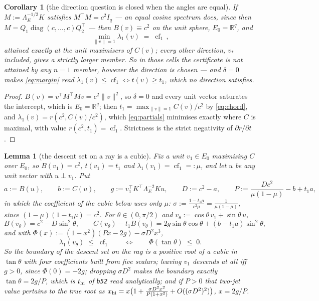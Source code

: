 \documentclass[11pt]{article}
\newtheorem{corollary}[theorem]{Corollary}
\newtheorem{lemma}[theorem]{Lemma}
\theoremstyle{remark}
\newcommand{\Le}{\Lambda_E}
\begin{document}
\begin{corollary}[the direction question is closed when the angles are equal]\label{cor:equal}
If $M:=\Le^{-1/2}K$ satisfies $M^{\top}M=c^{2}I_q$ --- an equal cosine spectrum does, since then
$M=Q_1\operatorname{diag}(c,\ldots,c)Q_2^{\top}$ --- then $B(v)\equiv c^{2}$ on the unit
sphere, $E_0=\mathbb R^{q}$, and
\[
  \min_{\|v\|=1}\lambda_1(v)\;=\;\operatorname{cf}_1\,,
\]
attained exactly at the unit maximisers of $C(v)$; every other direction, $v_\ast$ included, gives a
strictly larger member. So in those cells the certificate is \emph{not} attained by any $n=1$ member,
however the direction is chosen --- and $\delta=0$ makes \eqref{eq:margin} read
$\lambda_1(v)\le\operatorname{cf}_1\iff t(v)\ge t_1$, which no direction satisfies.
\end{corollary}

\begin{proof}
$B(v)=v^{\top}M^{\top}Mv=c^{2}\|v\|^{2}$, so $\delta=0$ and every unit vector saturates the intercept,
which is $E_0=\mathbb R^{q}$; then $t_1=\max_{\|v\|=1}C(v)/c^{2}$ by \eqref{eq:chord}, and
$\lambda_1(v)=r(c^{2},C(v)/c^{2})$, which \eqref{eq:partials} minimises exactly where $C$ is maximal,
with value $r(c^{2},t_1)=\operatorname{cf}_1$. Strictness is the strict negativity of
$\partial r/\partial t$.
\end{proof}

\begin{lemma}[the descent set on a ray is a cubic]\label{lem:cubic}
Fix a unit $v_1\in E_0$ maximising $C$ over $E_0$, so $B(v_1)=c^{2}$, $t(v_1)=t_1$ and
$\lambda_1(v_1)=\operatorname{cf}_1=:\mu$, and let $u$ be any unit vector with $u\perp v_1$. Put
\[
  a:=B(u),\qquad b:=C(u),\qquad g:=v_1^{\top}K^{\top}\Le^{-2}Ku,\qquad
  D:=c^{2}-a,\qquad P:=\frac{Dc^{2}}{\mu(1-\mu)}-b+t_1a ,
\]
in which the coefficient of the cubic below uses only $\mu$:
$\sigma:=\frac{1-t_1\mu}{c^{2}\mu}=\frac1{\mu(1-\mu)}$, since $(1-\mu)(1-t_1\mu)=c^{2}$.
For $\theta\in(0,\pi/2)$ and $v_\theta:=\cos\theta\,v_1+\sin\theta\,u$,
\[
  B(v_\theta)=c^{2}-D\sin^{2}\theta,\qquad
  C(v_\theta)-t_1B(v_\theta)=2g\sin\theta\cos\theta+(b-t_1a)\sin^{2}\theta,
\]
and with $\Phi(x):=(1+x^{2})(Px-2g)-\sigma D^{2}x^{3}$,
\begin{equation}\label{eq:raycubic}
  \lambda_1(v_\theta)\;\le\;\operatorname{cf}_1\qquad\Longleftrightarrow\qquad
  \Phi(\tan\theta)\;\le\;0 .
\end{equation}
So the boundary of the descent set on the ray is a positive root of a cubic in $\tan\theta$ with four
coefficients built from five scalars; leaving $v_1$ descends at all iff $g>0$, since $\Phi(0)=-2g$;
dropping $\sigma D^{2}$ makes the boundary exactly $\tan\theta=2g/P$, which is $t_{\rm hi}$ of
\texttt{b52} read analytically; and if $P>0$ that two-jet value pertains to the true root as
$x_{\rm hi}=x\bigl(1+\frac{\sigma D^{2}x^{2}}{P(1+x^{2})}+O((\sigma D^{2})^{2})\bigr)$, $x=2g/P$.
\end{lemma}
\end{document}
